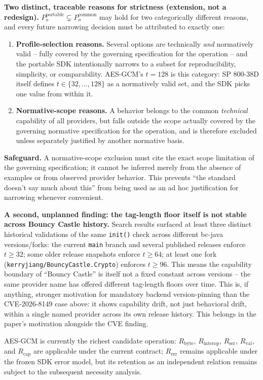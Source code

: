 \documentclass[11pt,a4paper]{article}
\begin{document}
\textbf{Two distinct, traceable reasons for strictness (extension, not a redesign).} $P_o^{\text{portable}} \subsetneq P_o^{\text{common}}$ may hold for two categorically different reasons, and every future narrowing decision must be attributed to exactly one:
\begin{enumerate}
\item \textbf{Profile-selection reasons.} Several options are technically \emph{and} normatively valid -- fully covered by the governing specification for the operation -- and the portable SDK intentionally narrows to a subset for reproducibility, simplicity, or comparability. AES-GCM's $t=128$ is this category: SP 800-38D itself defines $t \in \{32,\ldots,128\}$ as a normatively valid set, and the SDK picks one value from within it.
\item \textbf{Normative-scope reasons.} A behavior belongs to the common \emph{technical} capability of all providers, but falls outside the scope actually covered by the governing normative specification for the operation, and is therefore excluded unless separately justified by another normative basis.
\end{enumerate}
\textbf{Safeguard.} A normative-scope exclusion must cite the exact scope limitation of the governing specification; it cannot be inferred merely from the absence of examples or from observed provider behavior. This prevents ``the standard doesn't say much about this'' from being used as an ad hoc justification for narrowing whenever convenient.

\textbf{A second, unplanned finding: the tag-length floor itself is not stable across Bouncy Castle history.} Search results surfaced at least three distinct historical validations of the same \texttt{init()} check across different bc-java versions/forks: the current \texttt{main} branch and several published releases enforce $t \ge 32$; some older release snapshots enforce $t \ge 64$; at least one fork (\texttt{kerryjiang/BouncyCastle.Crypto}) enforces $t \ge 96$. This means the capability boundary of ``Bouncy Castle'' is itself not a fixed constant across versions -- the same provider name has offered different tag-length floors over time. This is, if anything, stronger motivation for mandatory backend version-pinning than the CVE-2026-8149 case above: it shows capability drift, not just behavioral drift, within a single named provider across its own release history. This belongs in the paper's motivation alongside the CVE finding.

AES-GCM is currently the richest candidate operation: $R_{\text{byte}}$, $R_{\text{interop}}$, $R_{\text{ser}}$, $R_{\text{val}}$, and $R_{\text{cap}}$ are applicable under the current contract; $R_{\text{err}}$ remains applicable under the frozen SDK error model, but its retention as an independent relation remains subject to the subsequent necessity analysis.
\end{document}
